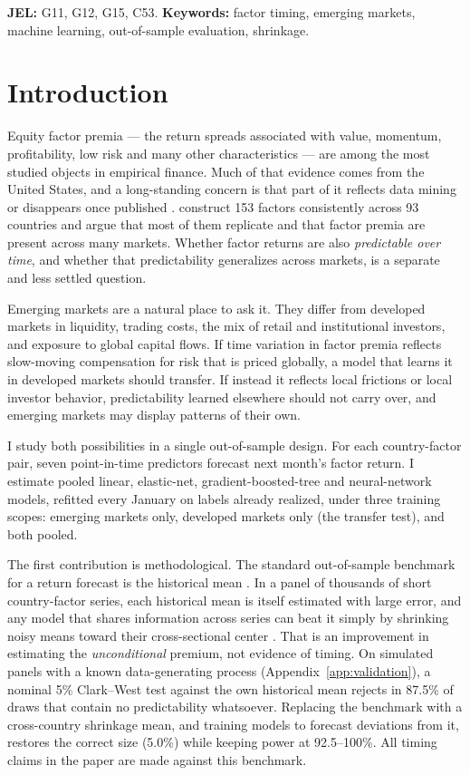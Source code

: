 \documentclass[11pt]{article}
\begin{document}
\noindent\textbf{JEL:} G11, G12, G15, C53. \quad \textbf{Keywords:} factor timing, emerging markets, machine learning, out-of-sample evaluation, shrinkage.

\newpage
\section{Introduction}

Equity factor premia --- the return spreads associated with value, momentum, profitability, low risk and many other characteristics --- are among the most studied objects in empirical finance. Much of that evidence comes from the United States, and a long-standing concern is that part of it reflects data mining or disappears once published \citep{mclean2016academic}. \citet{jensen2023replication} construct 153 factors consistently across 93 countries and argue that most of them replicate and that factor premia are present across many markets. Whether factor returns are also \emph{predictable over time}, and whether that predictability generalizes across markets, is a separate and less settled question.

Emerging markets are a natural place to ask it. They differ from developed markets in liquidity, trading costs, the mix of retail and institutional investors, and exposure to global capital flows. If time variation in factor premia reflects slow-moving compensation for risk that is priced globally, a model that learns it in developed markets should transfer. If instead it reflects local frictions or local investor behavior, predictability learned elsewhere should not carry over, and emerging markets may display patterns of their own.

I study both possibilities in a single out-of-sample design. For each country-factor pair, seven point-in-time predictors forecast next month's factor return. I estimate pooled linear, elastic-net, gradient-boosted-tree and neural-network models, refitted every January on labels already realized, under three training scopes: emerging markets only, developed markets only (the transfer test), and both pooled.

The first contribution is methodological. The standard out-of-sample benchmark for a return forecast is the historical mean \citep{welch2008comprehensive,campbell2008predicting}. In a panel of thousands of short country-factor series, each historical mean is itself estimated with large error, and any model that shares information across series can beat it simply by shrinking noisy means toward their cross-sectional center \citep{efron1975data}. That is an improvement in estimating the \emph{unconditional} premium, not evidence of timing. On simulated panels with a known data-generating process (Appendix~\ref{app:validation}), a nominal 5\% Clark--West test against the own historical mean rejects in 87.5\% of draws that contain no predictability whatsoever. Replacing the benchmark with a cross-country shrinkage mean, and training models to forecast deviations from it, restores the correct size (5.0\%) while keeping power at 92.5--100\%. All timing claims in the paper are made against this benchmark.
\end{document}

